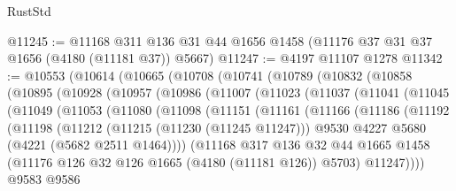\begin{lexlean}{RustStd}
\begin{coremodule}
@11245 := @11168 @311 @136 @31 @44 @1656 @1458 (@11176 @37 @31 @37 @1656 (@4180 (@11181 @37)) @5667)
@11247 := @4197 @11107 @1278
@11342 := @10553
    (@10614
      (@10665
        (@10708
          (@10741
            (@10789
              (@10832
                (@10858
                  (@10895
                    (@10928
                      (@10957
                        (@10986
                          (@11007
                            (@11023
                              (@11037
                                (@11041
                                  (@11045
                                    (@11049
                                      (@11053
                                        (@11080
                                          (@11098
                                            (@11151
                                              (@11161
                                                (@11166
                                                  (@11186
                                                    (@11192
                                                      (@11198
                                                        (@11212
                                                          (@11215 (@11230 (@11245 @11247)))
                                                          @9530
                                                          @4227
                                                          @5680
                                                          (@4221 (@5682 @2511 @1464))))
                                                      (@11168
                                                        @317
                                                        @136
                                                        @32
                                                        @44
                                                        @1665
                                                        @1458
                                                        (@11176
                                                          @126
                                                          @32
                                                          @126
                                                          @1665
                                                          (@4180 (@11181 @126))
                                                          @5703)
                                                        @11247))))
                                                @9583
                                                @9586

\end{coremodule}
\end{lexlean}
